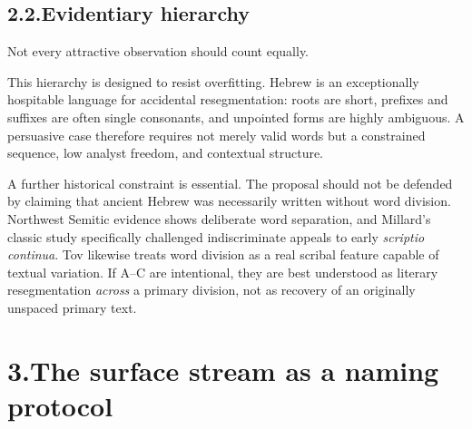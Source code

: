 \subsection*{2.2.\quad Evidentiary hierarchy}

Not every attractive observation should count equally.


This hierarchy is designed to resist overfitting.  Hebrew is an exceptionally hospitable language for accidental resegmentation: roots are short, prefixes and suffixes are often single consonants, and unpointed forms are highly ambiguous.  A persuasive case therefore requires not merely valid words but a constrained sequence, low analyst freedom, and contextual structure.

A further historical constraint is essential.  The proposal should not be defended by claiming that ancient Hebrew was necessarily written without word division.  Northwest Semitic evidence shows deliberate word separation, and Millard's classic study specifically challenged indiscriminate appeals to early \textit{scriptio continua}.\cite{Millard1970}  Tov likewise treats word division as a real scribal feature capable of textual variation.\cite{Tov2012}  If A--C are intentional, they are best understood as literary resegmentation \emph{across} a primary division, not as recovery of an originally unspaced primary text.

\section*{3.\quad The surface stream as a naming protocol}

